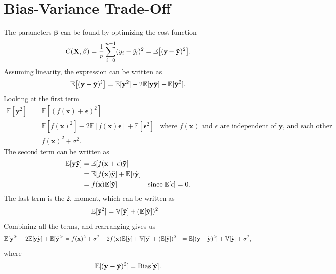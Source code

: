 \section{Bias-Variance Trade-Off}\label{ap:bias_var_eq}
The parameters $\mathbf{\beta}$ can be found by optimizing the cost function
\begin{equation*}
    C(\mathbf{X}, \mathbf{\beta}) = \frac{1}{n} \sum_{i=0}^{n-1} ( y_{i} - \Tilde{y}_{i} )^{2} = \mathbb{E} \big[ ( \mathbf{y} - \mathbf{\Tilde{y}} )^{2} \big] .
\end{equation*}
Assuming linearity, the expression can be written as 
\begin{equation*}
    \mathbb{E} \big[ ( \mathbf{y} - \mathbf{\Tilde{y}} )^{2} \big] = \mathbb{E} [ \mathbf{y}^{2} ] - 2 \mathbb{E} [ \mathbf{y} \mathbf{\Tilde{y}} ] + \mathbb{E} [ \mathbf{\Tilde{y}}^{2} ].
\end{equation*}
Looking at the first term
\begin{align*}
    \mathbb{E} [ \mathbf{y}^{2} ] &= \mathbb{E} [ ( f(\mathbf{x}) + \mathbf{\epsilon} )^{2} ] \\
    &= \mathbb{E} [ f(\mathbf{x})^{2} ] - 2 \mathbb{E} [ f(\mathbf{x}) \mathbf{\epsilon} ] + \mathbb{E} [ \mathbf{\epsilon}^{2} ] & \text{where $f(\mathbf{x})$ and $\epsilon$ are independent of $\mathbf{y}$, and each other} \\
    &= f(\mathbf{x})^{2} + \sigma^{2} .
\end{align*}
The second term can be written as 
\begin{align*}
    \mathbb{E} [ \mathbf{y} \mathbf{\Tilde{y}} ] &= \mathbb{E} [ f(\mathbf{x} + \mathbf{\epsilon}) \mathbf{\Tilde{y}} ] \\
    &= \mathbb{E} [ f(\mathbf{x}) \mathbf{\Tilde{y}} ] + \mathbb{E} [ \epsilon \mathbf{\Tilde{y}} ] \\
    &=  f(\mathbf{x}) \mathbb{E} [ \mathbf{\Tilde{y}} ] & \text{since $\mathbb{E}[\mathbf{\epsilon}] = 0$} .
\end{align*}
The last term is the 2. moment, which can be written as 
\begin{align*}
    \mathbb{E} [ \mathbf{\Tilde{y}}^{2} ] &= \mathbb{V}[\mathbf{\Tilde{y}}] + (\mathbb{E} [ \mathbf{\Tilde{y}} ])^{2} 
\end{align*}
Combining all the terms, and rearranging gives us
\begin{align*}
    \mathbb{E} [ \mathbf{y}^{2} ] - 2 \mathbb{E} [ \mathbf{y} \mathbf{\Tilde{y}} ] + \mathbb{E} [ \mathbf{\Tilde{y}}^{2} ] &= f(\mathbf{x})^{2} + \sigma^{2} - 2 f(\mathbf{x}) \mathbb{E} [ \mathbf{\Tilde{y}} ] + \mathbb{V}[\mathbf{\Tilde{y}}] + (\mathbb{E} [ \mathbf{\Tilde{y}} ])^{2} 
    &= \mathbb{E} [ (\mathbf{y} - \mathbf{\Tilde{y}})^{2} ] + \mathbb{V}[\mathbf{\Tilde{y}}] + \sigma^{2} , 
\end{align*}
where 
\begin{align*}
    \mathbb{E} [ (\mathbf{y} - \mathbf{\Tilde{y}})^{2} ] = \text{Bias}[\mathbf{\Tilde{y}}]. 
\end{align*}

